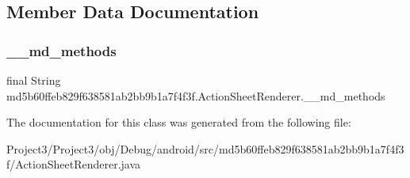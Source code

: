 \subsection{Member Data Documentation}
\mbox{\label{classmd5b60ffeb829f638581ab2bb9b1a7f4f3f_1_1ActionSheetRenderer_aba5845659bc7d9990f99b9029736fd0b}} 
\subsubsection{\texorpdfstring{\+\_\+\+\_\+md\+\_\+methods}{\_\_md\_methods}}
{\footnotesize\ttfamily final String md5b60ffeb829f638581ab2bb9b1a7f4f3f.\+Action\+Sheet\+Renderer.\+\_\+\+\_\+md\+\_\+methods\hspace{0.3cm}{\ttfamily [static]}}



The documentation for this class was generated from the following file\+:\begin{DoxyCompactItemize}
\item 
Project3/\+Project3/obj/\+Debug/android/src/md5b60ffeb829f638581ab2bb9b1a7f4f3f/Action\+Sheet\+Renderer.\+java\end{DoxyCompactItemize}

